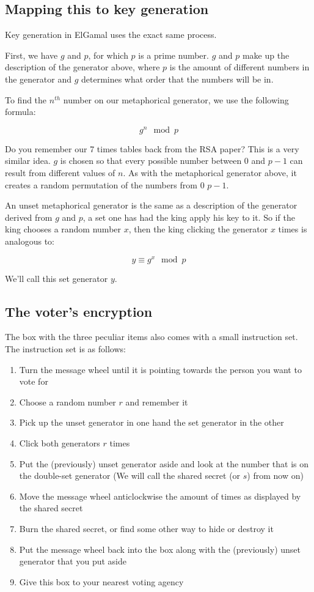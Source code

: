 \documentclass{article}
\begin{document}
  \subsection*{Mapping this to key generation}
  Key generation in ElGamal uses the exact same process.

  First, we have $g$ and $p$, for which $p$ is a prime number. $g$ and $p$ make
  up the description of the generator above, where $p$ is the amount of different
  numbers in the generator and $g$ determines what order that the numbers will
  be in.

  To find the $n^{th}$ number on our metaphorical generator, we use the following formula:
  
  \[ g^n \mod p \]

  Do you remember our 7 times tables back from the RSA paper? This is a very
  similar idea. $g$ is chosen so that every possible number between $0$ and $p-1$
  can result from different values of $n$. As with the metaphorical generator above,
  it creates a random permutation of the numbers from $0$ $p-1$.

  An unset metaphorical generator is the same as a description of the generator
  derived from $g$ and $p$, a set one has had the king apply his key to it. So
  if the king chooses a random number $x$, then the king clicking the generator
  $x$ times is analogous to:

  \[ y \equiv g^x \mod p \]
  
  We'll call this set generator $y$.

  \subsection*{The voter's encryption}
  The box with the three peculiar items also comes with a small instruction set.
  The instruction set is as follows:

  \begin{enumerate}
    \item Turn the message wheel until it is pointing towards the person you want to vote for
    \item Choose a random number $r$ and remember it
    \item Pick up the unset generator in one hand the set generator in the other
    \item Click both generators $r$ times
    \item Put the (previously) unset generator aside and look at the number that is on the double-set generator
      (We will call the shared secret (or $s$) from now on)
    \item Move the message wheel anticlockwise the amount of times as displayed by the shared secret
    \item Burn the shared secret, or find some other way to hide or destroy it
    \item Put the message wheel back into the box along with the (previously) unset generator that you put aside
    \item Give this box to your nearest voting agency
  \end{enumerate}
\end{document}
